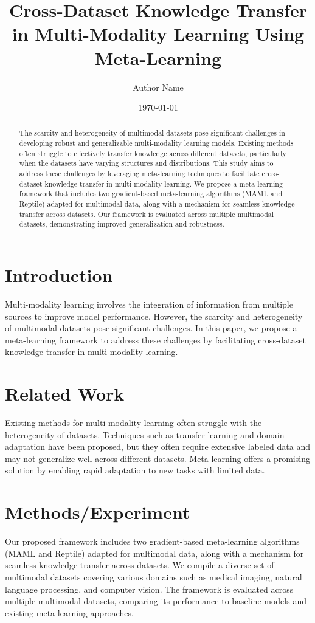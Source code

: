 \documentclass{article}
\title{Cross-Dataset Knowledge Transfer in Multi-Modality Learning Using Meta-Learning}
\author{Author Name}
\date{\today}
\begin{document}
\maketitle

\begin{abstract}
The scarcity and heterogeneity of multimodal datasets pose significant challenges in developing robust and generalizable multi-modality learning models. Existing methods often struggle to effectively transfer knowledge across different datasets, particularly when the datasets have varying structures and distributions. This study aims to address these challenges by leveraging meta-learning techniques to facilitate cross-dataset knowledge transfer in multi-modality learning. We propose a meta-learning framework that includes two gradient-based meta-learning algorithms (MAML and Reptile) adapted for multimodal data, along with a mechanism for seamless knowledge transfer across datasets. Our framework is evaluated across multiple multimodal datasets, demonstrating improved generalization and robustness.
\end{abstract}

\section{Introduction}
Multi-modality learning involves the integration of information from multiple sources to improve model performance. However, the scarcity and heterogeneity of multimodal datasets pose significant challenges. In this paper, we propose a meta-learning framework to address these challenges by facilitating cross-dataset knowledge transfer in multi-modality learning.

\section{Related Work}
Existing methods for multi-modality learning often struggle with the heterogeneity of datasets. Techniques such as transfer learning and domain adaptation have been proposed, but they often require extensive labeled data and may not generalize well across different datasets. Meta-learning offers a promising solution by enabling rapid adaptation to new tasks with limited data. 

\section{Methods/Experiment}
Our proposed framework includes two gradient-based meta-learning algorithms (MAML and Reptile) adapted for multimodal data, along with a mechanism for seamless knowledge transfer across datasets. We compile a diverse set of multimodal datasets covering various domains such as medical imaging, natural language processing, and computer vision. The framework is evaluated across multiple multimodal datasets, comparing its performance to baseline models and existing meta-learning approaches.
\end{document}
